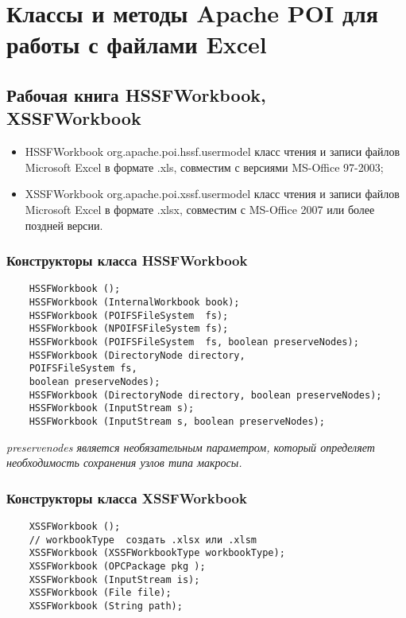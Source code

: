  \chapter{Классы и методы Apache POI для работы с файлами Excel}

\section{Рабочая книга HSSFWorkbook, XSSFWorkbook}

\begin{itemize}
	\item HSSFWorkbook org.apache.poi.hssf.usermodel класс чтения и записи файлов Microsoft Excel в формате .xls, совместим с версиями MS-Office 97-2003;
	\item XSSFWorkbook org.apache.poi.xssf.usermodel класс чтения и записи файлов Microsoft Excel в формате .xlsx, совместим с MS-Office 2007 или более поздней версии.
\end{itemize}

\subsection{Конструкторы класса HSSFWorkbook}

\begin{lstlisting}
	HSSFWorkbook ();
	HSSFWorkbook (InternalWorkbook book);
	HSSFWorkbook (POIFSFileSystem  fs);
	HSSFWorkbook (NPOIFSFileSystem fs);
	HSSFWorkbook (POIFSFileSystem  fs, boolean preserveNodes);
	HSSFWorkbook (DirectoryNode directory,
	POIFSFileSystem fs,
	boolean preserveNodes);
	HSSFWorkbook (DirectoryNode directory, boolean preserveNodes);
	HSSFWorkbook (InputStream s);
	HSSFWorkbook (InputStream s, boolean preserveNodes);
\end{lstlisting}

\textit{preservenodes является необязательным параметром, который определяет необходимость сохранения узлов типа макросы.}

\subsection{Конструкторы класса XSSFWorkbook}

\begin{lstlisting}
	XSSFWorkbook ();
	// workbookType  создать .xlsx или .xlsm
	XSSFWorkbook (XSSFWorkbookType workbookType);
	XSSFWorkbook (OPCPackage pkg );
	XSSFWorkbook (InputStream is);
	XSSFWorkbook (File file);
	XSSFWorkbook (String path);
\end{lstlisting}

